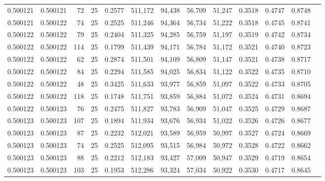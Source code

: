 \begin{tabular}{rrrrrrrrrrrrr}
0.500121 & 0.500121 &    72 &  25 &                                     0.2577 & 511,172 &  94,438 &  56,709 &  51,247 & 0.3518 & 0.4747 & 0.8748 \\
0.500121 & 0.500122 &    74 &  25 &                                     0.2525 & 511,246 &  94,364 &  56,734 &  51,222 & 0.3518 & 0.4745 & 0.8741 \\
0.500122 & 0.500122 &    79 &  25 &                                     0.2404 & 511,325 &  94,285 &  56,759 &  51,197 & 0.3519 & 0.4742 & 0.8734 \\
0.500122 & 0.500122 &   114 &  25 &                                     0.1799 & 511,439 &  94,171 &  56,784 &  51,172 & 0.3521 & 0.4740 & 0.8723 \\
0.500122 & 0.500122 &    62 &  25 &                                     0.2874 & 511,501 &  94,109 &  56,809 &  51,147 & 0.3521 & 0.4738 & 0.8717 \\
0.500122 & 0.500122 &    84 &  25 &                                     0.2294 & 511,585 &  94,025 &  56,834 &  51,122 & 0.3522 & 0.4735 & 0.8710 \\
0.500122 & 0.500122 &    48 &  25 &                                     0.3425 & 511,633 &  93,977 &  56,859 &  51,097 & 0.3522 & 0.4733 & 0.8705 \\
0.500122 & 0.500122 &   118 &  25 &                                     0.1748 & 511,751 &  93,859 &  56,884 &  51,072 & 0.3524 & 0.4731 & 0.8694 \\
0.500122 & 0.500123 &    76 &  25 &                                     0.2475 & 511,827 &  93,783 &  56,909 &  51,047 & 0.3525 & 0.4729 & 0.8687 \\
0.500123 & 0.500123 &   107 &  25 &                                     0.1894 & 511,934 &  93,676 &  56,934 &  51,022 & 0.3526 & 0.4726 & 0.8677 \\
0.500123 & 0.500123 &    87 &  25 &                                     0.2232 & 512,021 &  93,589 &  56,959 &  50,997 & 0.3527 & 0.4724 & 0.8669 \\
0.500123 & 0.500123 &    74 &  25 &                                     0.2525 & 512,095 &  93,515 &  56,984 &  50,972 & 0.3528 & 0.4722 & 0.8662 \\
0.500123 & 0.500123 &    88 &  25 &                                     0.2212 & 512,183 &  93,427 &  57,009 &  50,947 & 0.3529 & 0.4719 & 0.8654 \\
0.500123 & 0.500123 &   103 &  25 &                                     0.1953 & 512,286 &  93,324 &  57,034 &  50,922 & 0.3530 & 0.4717 & 0.8645 \\

\end{tabular}
